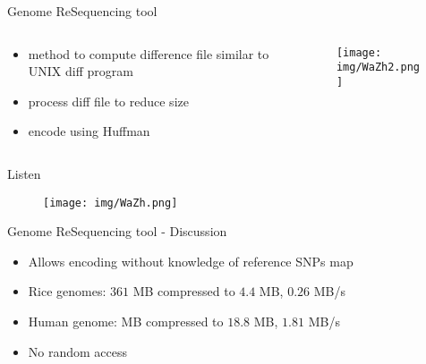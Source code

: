 \documentclass[aspectratio=1610]{beamer}
\begin{document}
\begin{frame}{Genome ReSequencing tool}
  \begin{columns}
  \begin{column}{6cm}
    \begin{itemize}
      \item method to compute difference file similar to UNIX diff program
      \item process diff file to reduce size
      \item encode using Huffman
    \end{itemize}
  \end{column}
  \begin{column}{6cm}
    \begin{figure}
      \texttt{[image: img/WaZh2.png]}
    \end{figure}
  \end{column}
  \end{columns}
\end{frame}

\begin{frame}[plain]{Listen}
\vfill
\begin{center}
  \begin{figure}
    \texttt{[image: img/WaZh.png]}
  \end{figure}
  \end{center}
\end{frame}

\begin{frame}{Genome ReSequencing tool - Discussion}
  \begin{itemize}
    \item Allows encoding without knowledge of reference SNPs map
    \item Rice genomes: $361$ MB compressed to $4.4$ MB, $0.26$ MB/s
    \item Human genome:  MB compressed to $18.8$ MB, $1.81$ MB/s
  \end{itemize}
  \begin{itemize}
    \item No random access
  \end{itemize}
\end{frame}
\end{document}
